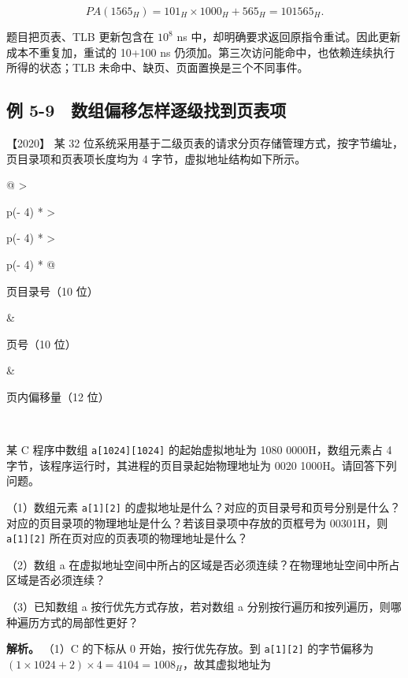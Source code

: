 \[PA(1565_H)=101_H\times1000_H+565_H=101565_H.\]

题目把页表、TLB 更新包含在 \(10^8\) ns 中，却明确要求返回原指令重试。因此更新成本不重复加，重试的 10+100 ns 仍须加。第三次访问能命中，也依赖连续执行所得的状态；TLB 未命中、缺页、页面置换是三个不同事件。

\subsection{例 5-9　数组偏移怎样逐级找到页表项}\label{os-ex5-9}

\noindent{}【2020】 某 32 位系统采用基于二级页表的请求分页存储管理方式，按字节编址，页目录项和页表项长度均为 4 字节，虚拟地址结构如下所示。

\begin{longtable}[]{@{}
  >{\raggedright\arraybackslash}p{(\columnwidth - 4\tabcolsep) * }
  >{\raggedright\arraybackslash}p{(\columnwidth - 4\tabcolsep) * }
  >{\raggedright\arraybackslash}p{(\columnwidth - 4\tabcolsep) * }@{}}
\toprule\noalign{}
\begin{minipage}[b]{\linewidth}\raggedright
页目录号（10 位）
\end{minipage} & \begin{minipage}[b]{\linewidth}\raggedright
页号（10 位）
\end{minipage} & \begin{minipage}[b]{\linewidth}\raggedright
页内偏移量（12 位）
\end{minipage} \\
\midrule\noalign{}
\endhead
\bottomrule\noalign{}
\endlastfoot
\end{longtable}

某 C 程序中数组 \texttt{a{[}1024{]}{[}1024{]}} 的起始虚拟地址为 1080 0000H，数组元素占 4 字节，该程序运行时，其进程的页目录起始物理地址为 0020 1000H。请回答下列问题。

（1）数组元素 \texttt{a{[}1{]}{[}2{]}} 的虚拟地址是什么？对应的页目录号和页号分别是什么？对应的页目录项的物理地址是什么？若该目录项中存放的页框号为 00301H，则 \texttt{a{[}1{]}{[}2{]}} 所在页对应的页表项的物理地址是什么？

（2）数组 a 在虚拟地址空间中所占的区域是否必须连续？在物理地址空间中所占区域是否必须连续？

（3）已知数组 a 按行优先方式存放，若对数组 a 分别按行遍历和按列遍历，则哪种遍历方式的局部性更好？


\textbf{解析。} （1）C 的下标从 0 开始，按行优先存放。到 \texttt{a{[}1{]}{[}2{]}} 的字节偏移为 \((1\times1024+2)\times4=4104=1008_H\)，故其虚拟地址为

